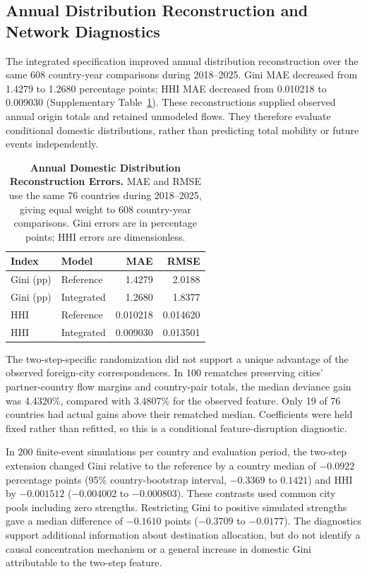 \subsection{Annual Distribution Reconstruction and Network Diagnostics}
\label{supp:network_diagnostics}

The integrated specification improved annual distribution reconstruction over the same 608 country-year comparisons during 2018--2025. Gini MAE decreased from 1.4279 to 1.2680 percentage points; HHI MAE decreased from 0.010218 to 0.009030 (Supplementary Table~\ref{tab:gravity_errors}). These reconstructions supplied observed annual origin totals and retained unmodeled flows. They therefore evaluate conditional domestic distributions, rather than predicting total mobility or future events independently.

\begin{table}[!htbp]
\centering
\caption{\textbf{Annual Domestic Distribution Reconstruction Errors.} MAE and RMSE use the same 76 countries during 2018--2025, giving equal weight to 608 country-year comparisons. Gini errors are in percentage points; HHI errors are dimensionless.}
\label{tab:gravity_errors}
\small
\begin{tabular}{llrr}
\hline
Index & Model & MAE & RMSE \\
\hline
Gini (pp) & Reference & 1.4279 & 2.0188 \\
Gini (pp) & Integrated & 1.2680 & 1.8377 \\
HHI & Reference & 0.010218 & 0.014620 \\
HHI & Integrated & 0.009030 & 0.013501 \\
\hline
\end{tabular}
\end{table}
\FloatBarrier

The two-step-specific randomization did not support a unique advantage of the observed foreign-city correspondences. In 100 rematches preserving cities' partner-country flow margins and country-pair totals, the median deviance gain was 4.4320\%, compared with 3.4807\% for the observed feature. Only 19 of 76 countries had actual gains above their rematched median. Coefficients were held fixed rather than refitted, so this is a conditional feature-disruption diagnostic.

In 200 finite-event simulations per country and evaluation period, the two-step extension changed Gini relative to the reference by a country median of $-0.0922$ percentage points (95\% country-bootstrap interval, $-0.3369$ to $0.1421$) and HHI by $-0.001512$ ($-0.004002$ to $-0.000803$). These contrasts used common city pools including zero strengths. Restricting Gini to positive simulated strengths gave a median difference of $-0.1610$ points ($-0.3709$ to $-0.0177$). The diagnostics support additional information about destination allocation, but do not identify a causal concentration mechanism or a general increase in domestic Gini attributable to the two-step feature.

